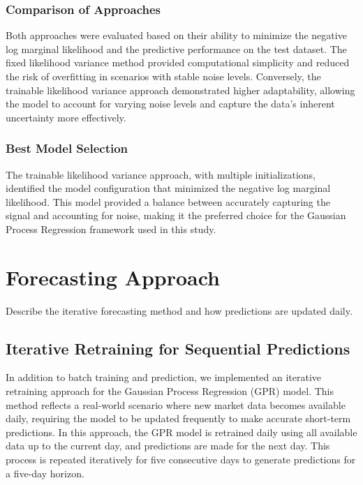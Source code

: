\subsubsection{Comparison of Approaches}

Both approaches were evaluated based on their ability to minimize the negative log marginal likelihood and the predictive performance on the test dataset. The fixed likelihood variance method provided computational simplicity and reduced the risk of overfitting in scenarios with stable noise levels. Conversely, the trainable likelihood variance approach demonstrated higher adaptability, allowing the model to account for varying noise levels and capture the data's inherent uncertainty more effectively.

\subsubsection{Best Model Selection}

The trainable likelihood variance approach, with multiple initializations, identified the model configuration that minimized the negative log marginal likelihood. This model provided a balance between accurately capturing the signal and accounting for noise, making it the preferred choice for the Gaussian Process Regression framework used in this study.


\section{Forecasting Approach}
Describe the iterative forecasting method and how predictions are updated daily.

\subsection{Iterative Retraining for Sequential Predictions}

In addition to batch training and prediction, we implemented an iterative retraining approach for the Gaussian Process Regression (GPR) model. This method reflects a real-world scenario where new market data becomes available daily, requiring the model to be updated frequently to make accurate short-term predictions. In this approach, the GPR model is retrained daily using all available data up to the current day, and predictions are made for the next day. This process is repeated iteratively for five consecutive days to generate predictions for a five-day horizon.


